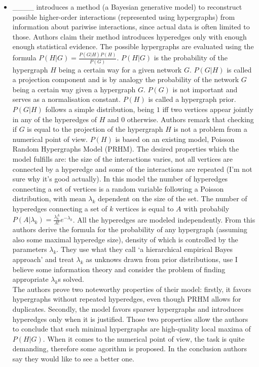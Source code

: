 \begin{itemize}
    \item 
    ____
    introduces a method (a Bayesian generative model) to reconstruct possible higher-order interactions (represented using hypergraphs) from information about pariwise interactions, since actual data is often limited to those. Authors claim their method introduces hyperedges only with enough enough statistical evidence. The possible hypergraphs are evaluated using the formula \(P(H|G) = \frac{P(G|H)P(H)}{P(G)}\). \(P(H|G)\) is the probability of the hypergraph $H$ being a certain way for a given network $G$. $P(G|H)$ is called a projection component and is by analogy the probability of the network $G$ being a certain way given a hypergraph $G$. $P(G)$ is not important and serves as a normalisation constant. $P(H)$ is called a hypergraph prior. \\ 
    $P(G|H)$ follows a simple distribution, being $1$ iff two vertices appear jointly in any of the hyperedges of $H$ and $0$ otherwise. Authors remark that checking if $G$ is equal to the projection of the hypergraph $H$ is not a problem from a numerical point of view.
    $P(H)$ is based on an existing model, Poisson Random Hypergraphs Model (PRHM). The desired properties which the model fulfills are: the size of the interactions varies, not all vertices are connected by a hyperedge and some of the interactions are repeated (I'm not sure why it's good actually). 
    In this model the number of hyperedges connecting a set of vertices is a random variable following a Poisson distribution, with mean $\lambda_k$ dependent on the size of the set. The number of hyperedges connecting a set of $k$ vertices is equal to $A$ with probabily $P(A|\lambda_k) = \frac{\lambda_k^A}{A!}e^{-\lambda_k}$. All the hyperedges are modeled independently. 
    From this authors derive the formula for the probability of any hypergraph (assuming also some maximal hyperedge size), density of which is controlled by the parameters $\lambda_k$. They use what they call `a hierarchical empirical Bayes approach' and treat $\lambda_k$ as unknows drawn from prior distributions, use I believe some information theory and consider the problem of finding appropriate $\lambda_k$s solved. \\ 
    The authors prove two noteworthy properties of their model: firstly, it favors hypergraphs without repeated hyperedges, even though PRHM allows for duplicates. Secondly, the model favors sparser hypergraphs and introduces hyperedges only when it is justified. Those two properties allow the authors to conclude that such minimal hypergraphs are high-quality local maxima of $P(H|G)$. When it comes to the numerical point of view, the task is quite demanding, therefore some agorithm is proposed. In the conclusion authors say they would like to see a better one. \\

\end{itemize}
